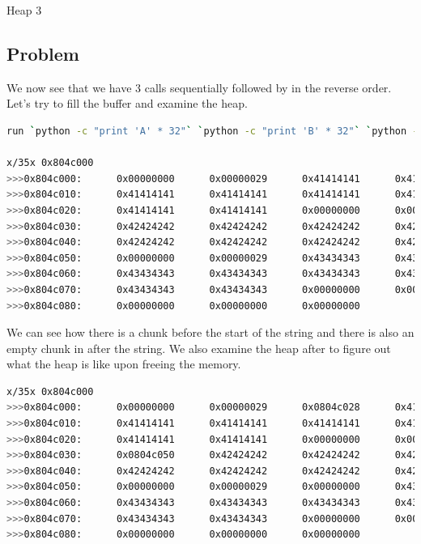 
\begin{center}\begin{LARGE}Heap 3\end{LARGE}\end{center}
 
\subsection*{Problem}

We now see that we have 3  calls sequentially followed by 
in the reverse order. Let's try to fill the buffer and examine the heap.

\begin{lstlisting}[language=bash]
run `python -c "print 'A' * 32"` `python -c "print 'B' * 32"` `python -c "print 'C' * 32"`

x/35x 0x804c000
>>>0x804c000:      0x00000000      0x00000029      0x41414141      0x41414141
>>>0x804c010:      0x41414141      0x41414141      0x41414141      0x41414141
>>>0x804c020:      0x41414141      0x41414141      0x00000000      0x00000029
>>>0x804c030:      0x42424242      0x42424242      0x42424242      0x42424242
>>>0x804c040:      0x42424242      0x42424242      0x42424242      0x42424242
>>>0x804c050:      0x00000000      0x00000029      0x43434343      0x43434343
>>>0x804c060:      0x43434343      0x43434343      0x43434343      0x43434343
>>>0x804c070:      0x43434343      0x43434343      0x00000000      0x00000f89
>>>0x804c080:      0x00000000      0x00000000      0x00000000
\end{lstlisting}

We can see how there is a chunk before the start of the string and there is also
an empty chunk in after the string. We also examine the heap after 
to figure out what the heap is like upon freeing the memory.

\begin{lstlisting}[language=bash]
x/35x 0x804c000
>>>0x804c000:      0x00000000      0x00000029      0x0804c028      0x41414141
>>>0x804c010:      0x41414141      0x41414141      0x41414141      0x41414141
>>>0x804c020:      0x41414141      0x41414141      0x00000000      0x00000029
>>>0x804c030:      0x0804c050      0x42424242      0x42424242      0x42424242
>>>0x804c040:      0x42424242      0x42424242      0x42424242      0x42424242
>>>0x804c050:      0x00000000      0x00000029      0x00000000      0x43434343
>>>0x804c060:      0x43434343      0x43434343      0x43434343      0x43434343
>>>0x804c070:      0x43434343      0x43434343      0x00000000      0x00000f89
>>>0x804c080:      0x00000000      0x00000000      0x00000000  
\end{lstlisting}

